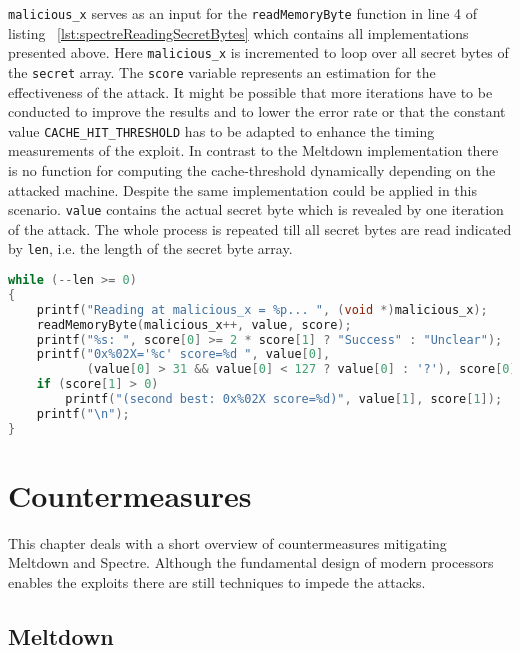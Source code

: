 \documentclass[a4paper,oneside,openright] {scrreprt}
\begin{document}
\texttt{malicious\_x} serves as an input for the \texttt{readMemoryByte} function in line 4 of listing ~\ref{lst:spectreReadingSecretBytes} 
which contains all implementations presented above.
Here \texttt{malicious\_x} is incremented to loop over all secret bytes of the \texttt{secret} array.
The \texttt{score} variable represents an estimation for the effectiveness of the attack.
It might be possible that more iterations have to be conducted to improve the results and to lower the error rate
 or that the constant value \texttt{CACHE\_HIT\_THRESHOLD} has to be adapted to enhance the timing measurements of the exploit.
In contrast to the Meltdown implementation there is no function for computing the cache-threshold dynamically depending on the attacked machine.
Despite the same implementation could be applied in this scenario.
\texttt{value} contains the actual secret byte which is revealed by one iteration of the attack.
The whole process is repeated till all secret bytes are read indicated by \texttt{len}, i.e. the length of the secret byte array.

\begin{lstlisting}[language=C, caption=Spectre: Reading Secret Bytes, label={lst:spectreReadingSecretBytes}]
while (--len >= 0)
{
    printf("Reading at malicious_x = %p... ", (void *)malicious_x);
    readMemoryByte(malicious_x++, value, score);
    printf("%s: ", score[0] >= 2 * score[1] ? "Success" : "Unclear");
    printf("0x%02X='%c' score=%d ", value[0],
           (value[0] > 31 && value[0] < 127 ? value[0] : '?'), score[0]);
    if (score[1] > 0)
        printf("(second best: 0x%02X score=%d)", value[1], score[1]);
    printf("\n");
}
\end{lstlisting}

\chapter{Countermeasures}
\label{ch:countermeasures}

This chapter deals with a short overview of countermeasures mitigating Meltdown and Spectre. 
Although the fundamental design of modern processors enables the exploits there are still techniques to impede
the attacks.

\section{Meltdown}
\label{ch:intro:motivation}
\end{document}
